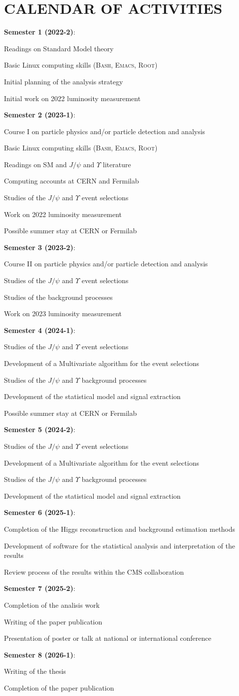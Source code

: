 \documentclass[final,3p]{CSP}
\newcommand{\SubItem}[1]{
    {\setlength\itemindent{15pt} \item[-] #1}
}
\begin{document}
\section{CALENDAR OF ACTIVITIES}
\onehalfspacing
\begin{itemize}
\setlength\itemsep{-0.5em}
\item {\bf Semester 1 (2022-2)}: 
  \SubItem{ Readings on Standard Model theory}
  \SubItem{ Basic Linux computing skills (\textsc{Bash, Emacs, Root})}
  \SubItem{ Initial planning of the analysis strategy}
  \SubItem{ Initial work on 2022 luminosity measurement}
\item {\bf Semester 2 (2023-1)}:
  \SubItem{ Course I on particle physics and/or particle detection and analysis}
  \SubItem{ Basic Linux computing skills (\textsc{Bash, Emacs, Root})}
  \SubItem{ Readings on SM and $J/\psi$ and $\Upsilon$ literature}
  \SubItem{ Computing accounts at CERN and Fermilab}
  \SubItem{ Studies of the $J/\psi$ and $\Upsilon$ event selections}
  \SubItem{ Work on 2022 luminosity measurement}
  \SubItem{ Possible summer stay at CERN or Fermilab}
\item {\bf Semester 3 (2023-2)}:
  \SubItem{ Course II on particle physics and/or particle detection and analysis}
  \SubItem{ Studies of the $J/\psi$ and $\Upsilon$ event selections}
  \SubItem{ Studies of the background processes}
  \SubItem{ Work on 2023 luminosity measurement}
\item {\bf Semester 4 (2024-1)}:
  \SubItem{ Studies of the $J/\psi$ and $\Upsilon$ event selections}
  \SubItem{ Development of a Multivariate algorithm for the event selections}
  \SubItem{ Studies of the $J/\psi$ and $\Upsilon$ background processes}
  \SubItem{ Development of the statistical model and signal extraction}
  \SubItem{ Possible summer stay at CERN or Fermilab}
\item {\bf Semester 5 (2024-2)}:
  \SubItem{ Studies of the $J/\psi$ and $\Upsilon$ event selections}
  \SubItem{ Development of a Multivariate algorithm for the event selections}
  \SubItem{ Studies of the $J/\psi$ and $\Upsilon$ background processes}
  \SubItem{ Development of the statistical model and signal extraction}
\item {\bf Semester 6 (2025-1)}:
  \SubItem{ Completion of the Higgs reconstruction and background estimation methods}
  \SubItem{ Development of software for the statistical analysis and interpretation of the results}
  \SubItem{ Review process of the results within the CMS collaboration}
\item {\bf Semester 7 (2025-2)}:
  \SubItem{ Completion of the analisis work}
  \SubItem{ Writing of the paper publication}
  \SubItem{ Presentation of poster or talk at national or international conference}
\item {\bf Semester 8 (2026-1)}:
  \SubItem{ Writing of the thesis}
  \SubItem{ Completion of the paper publication}
  
\end{itemize}




\cleardoublepage
\onehalfspacing


\end{document}
